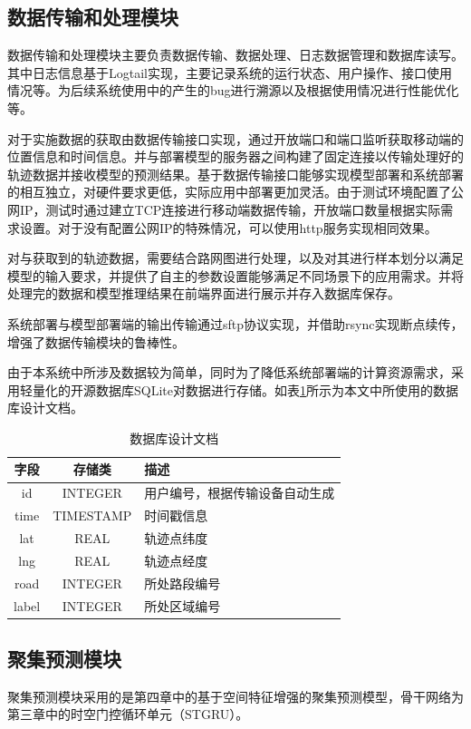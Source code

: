 \documentclass[master]{thesis-uestc}
\begin{document}
\subsection{数据传输和处理模块}
数据传输和处理模块主要负责数据传输、数据处理、日志数据管理和数据库读写。其中日志信息基于Logtail实现，主要记录系统的运行状态、用户操作、接口使用情况等。为后续系统使用中的产生的bug进行溯源以及根据使用情况进行性能优化等。

对于实施数据的获取由数据传输接口实现，通过开放端口和端口监听获取移动端的位置信息和时间信息。并与部署模型的服务器之间构建了固定连接以传输处理好的轨迹数据并接收模型的预测结果。基于数据传输接口能够实现模型部署和系统部署的相互独立，对硬件要求更低，实际应用中部署更加灵活。由于测试环境配置了公网IP，测试时通过建立TCP连接进行移动端数据传输，开放端口数量根据实际需求设置。对于没有配置公网IP的特殊情况，可以使用http服务实现相同效果。

对与获取到的轨迹数据，需要结合路网图进行处理，以及对其进行样本划分以满足模型的输入要求，并提供了自主的参数设置能够满足不同场景下的应用需求。并将处理完的数据和模型推理结果在前端界面进行展示并存入数据库保存。

系统部署与模型部署端的输出传输通过sftp协议实现，并借助rsync实现断点续传，增强了数据传输模块的鲁棒性。

由于本系统中所涉及数据较为简单，同时为了降低系统部署端的计算资源需求，采用轻量化的开源数据库SQLite对数据进行存储。如表\ref{Table.5.1}所示为本文中所使用的数据库设计文档。
\begin{table}[!ht]
\centering
\caption{数据库设计文档}%
\label{Table.5.1}
\begin{tabular}{ccl}
\hline
字段& 存储类 & 描述\\
\hline
id& INTEGER &用户编号，根据传输设备自动生成\\
time& TIMESTAMP &时间戳信息\\
lat&  REAL &轨迹点纬度\\
lng& REAL &轨迹点经度\\
road& INTEGER &所处路段编号\\
label& INTEGER &所处区域编号\\
\hline
\end{tabular}
\end{table}

\subsection{聚集预测模块}
聚集预测模块采用的是第四章中的基于空间特征增强的聚集预测模型，骨干网络为第三章中的时空门控循环单元（STGRU）。
\end{document}
